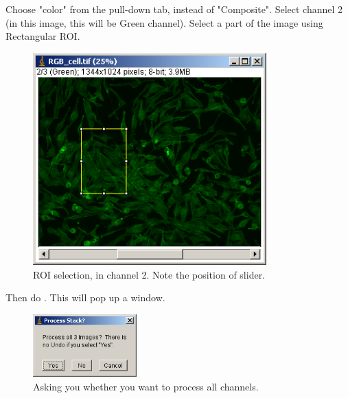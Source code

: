\begin{indentexercise}{1}
Choose "color" from the pull-down tab, instead of "Composite". Select channel 2 (in this image, this will be Green channel). Select a part of the image using Rectangular ROI. 
\begin{figure}[H]
\begin{center}
\includegraphics[width=9cm]{fig/CMCIBasicCourse201102-img18.png}
\caption{ ROI selection, in channel 2. Note the position of slider.}
\label{fig:img18}
\end{center}
\end{figure}

Then do . This will pop up a window. 
\begin{figure}[H]
\begin{center}
\includegraphics[width=4cm]{fig/CMCIBasicCourse201102-img19.png}
\caption{ Asking you whether you want to process all channels.}
\label{fig:img19}
\end{center}
\end{figure}


\end{indentexercise}
